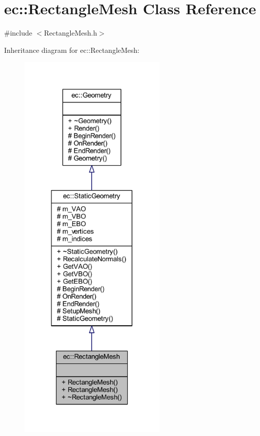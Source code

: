 \hypertarget{classec_1_1_rectangle_mesh}{}\section{ec\+:\+:Rectangle\+Mesh Class Reference}
\label{classec_1_1_rectangle_mesh}


{\ttfamily \#include $<$Rectangle\+Mesh.\+h$>$}



Inheritance diagram for ec\+:\+:Rectangle\+Mesh\+:
\nopagebreak
\begin{figure}[H]
\begin{center}
\leavevmode
\includegraphics[width=199pt]{classec_1_1_rectangle_mesh__inherit__graph}
\end{center}
\end{figure}


